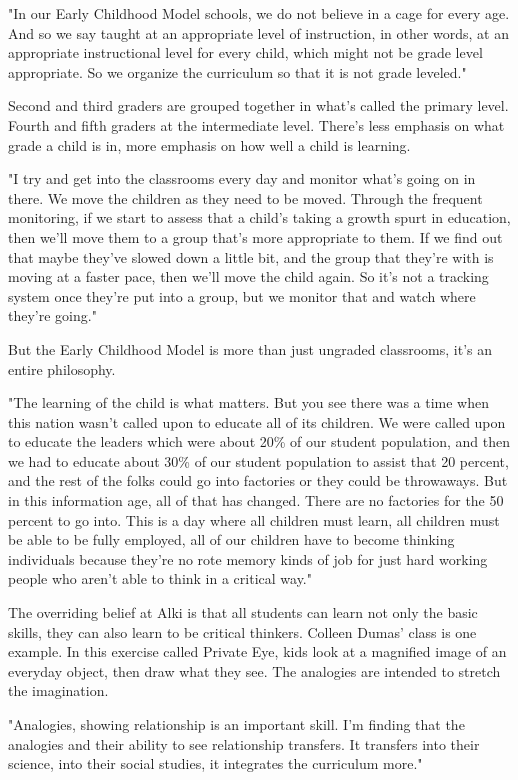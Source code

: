 "In our Early Childhood Model schools, we do not believe in a cage for every age. And so we say taught at an appropriate level of instruction, in other words, at an appropriate instructional level for every child, which might not be grade level appropriate. So we organize the curriculum so that it is not grade leveled."

Second and third graders are grouped together in what's called the primary level. Fourth and fifth graders at the intermediate level. There's less emphasis on what grade a child is in, more emphasis on how well a child is learning.

"I try and get into the classrooms every day and monitor what's going on in there. We move the children as they need to be moved. Through the frequent monitoring, if we start to assess that a child's taking a growth spurt in education, then we'll move them to a group that's more appropriate to them. If we find out that maybe they've slowed down a little bit, and the group that they're with is moving at a faster pace, then we'll move the child again. So it's not a tracking system once they're put into a group, but we monitor that and watch where they're going."

But the Early Childhood Model is more than just ungraded classrooms, it's an entire philosophy.

"The learning of the child is what matters. But you see there was a time when this nation wasn't called upon to educate all of its children. We were called upon to educate the leaders which were about 20\% of our student population, and then we had to educate about 30\% of our student population to assist that 20 percent, and the rest of the folks could go into factories or they could be throwaways. But in this information age, all of that has changed. There are no factories for the 50 percent to go into. This is a day where all children must learn, all children must be able to be fully employed, all of our children have to become thinking individuals because they're no rote memory kinds of job for just hard working people who aren't able to think in a critical way."

The overriding belief at Alki is that all students can learn not only the basic skills, they can also learn to be critical thinkers. Colleen Dumas' class is one example. In this exercise called Private Eye, kids look at a magnified image of an everyday object, then draw what they see. The analogies are intended to stretch the imagination.

"Analogies, showing relationship is an important skill. I'm finding that the analogies and their ability to see relationship transfers. It transfers into their science, into their social studies, it integrates the curriculum more."

